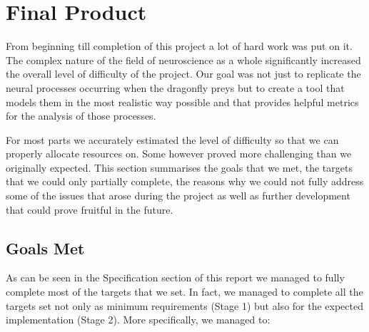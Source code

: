 \documentclass[a4paper,11pt]{article}
\begin{document}
\clearpage
\section{Final Product}

From beginning till completion of this project a lot of hard work was put on it. The complex nature of 
the field of neuroscience as a whole significantly increased the overall level of difficulty of the 
project. Our goal was not just to replicate the neural processes occurring when the dragonfly preys 
but to create a tool that models them in the most realistic way possible and that provides helpful 
metrics for the analysis of those processes.\par

For most parts we accurately estimated the level of difficulty so that we can properly allocate 
resources on. Some however proved more challenging than we originally expected. This section 
summarises the goals that we met, the targets that we could only partially complete, the reasons
why we could not fully address some of the issues that arose during the project as well as further
development that could prove fruitful in the future.

\subsection{Goals Met}

As can be seen in the Specification section of this report we managed to fully complete most of the 
targets that we set. In fact, we managed to complete all the targets set not only as minimum 
requirements (Stage 1) but also for the expected implementation (Stage 2). More specifically, we 
managed to:
\end{document}
